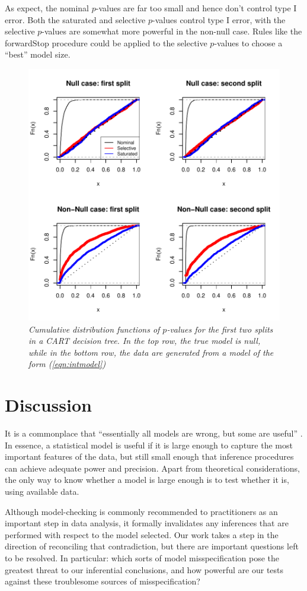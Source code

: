 \documentclass{article}
\begin{document}
As expect, the nominal $p$-values are far too small and hence don't control type I error.
Both the saturated and selective $p$-values control type I error, with the selective $p$-values are somewhat more powerful in the non-null case.
Rules like the forwardStop procedure could be applied  to the selective $p$-values to choose a ``best'' model size.
\begin{figure}[h]
  \centering
  \includegraphics[width=.65\textwidth]{figs/cart.pdf}
  \caption{\em Cumulative distribution functions of $p$-values for  the first two splits in a CART decision tree. In the top row, the true model is null,
  while in the bottom row, the data are generated from a  model of the form (\ref{eqn:intmodel})}
  \label{fig:cart}
\end{figure}

\section{Discussion}
\label{sec:discussion}


It is a commonplace that ``essentially all models are wrong, but some are useful'' \citep{box1987empirical}. In essence, a statistical model is useful if it is large enough to capture the most important features of the data, but still small enough that inference procedures can achieve adequate power and precision. Apart from theoretical considerations, the only way to know whether a model is large enough is to test whether it is, using available data.

Although model-checking is commonly recommended to practitioners as an important step in data analysis, it formally invalidates any inferences that are performed with respect to the model selected. Our work takes a step in the direction of reconciling that contradiction, but there are important questions left to be resolved. In particular: which sorts of model misspecification pose the greatest threat to our inferential conclusions, and how powerful are our tests against these troublesome sources of misspecification?
\end{document}
